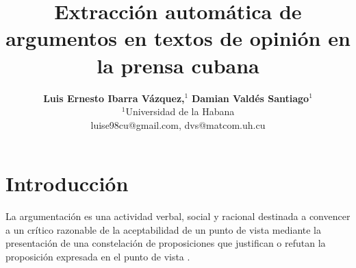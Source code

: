 \documentclass[a4paper,11pt,twocolumn,twoside]{article}
\title{Extracción automática de argumentos en textos de opinión en la prensa cubana}
\author {\textbf{Luis Ernesto Ibarra Vázquez,$^1$} \textbf{Damian Valdés Santiago$^1$}\\
$^1$Universidad de la Habana\\
luise98cu@gmail.com, dvs@matcom.uh.cu\\
}
\begin{document}

\setlength\titlebox{21cm} %


\label{firstpage} \maketitle

%

\section{Introducción}


La argumentación es una actividad verbal, social y racional destinada a convencer 
a un crítico razonable de la aceptabilidad de un punto de vista mediante la presentación 
de una constelación de proposiciones que justifican o refutan la proposición expresada 
en el punto de vista \cite{van2004systematic}. 



\end{document}
